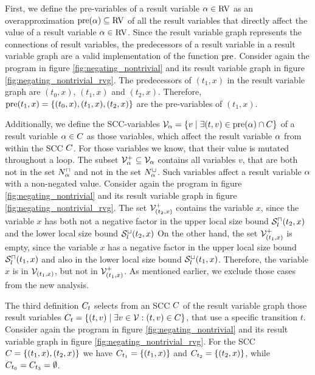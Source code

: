 First, we define the pre-variables of a result variable $\alpha \in \text{RV}$ as an overapproximation $\text{pre}(\alpha) \subseteq \text{RV}$ of all the result variables that directly affect the value of a result variable $\alpha \in \text{RV}$.
Since the result variable graph represents the connections of result variables, the predecessors of a result variable in a result variable graph are a valid implementation of the function $\text{pre}$.
Consider again the program in figure \ref{fig:negating_nontrivial} and its result variable graph in figure \ref{fig:negating_nontrivial_rvg}.
The predecessors of $(t_1,x)$ in the result variable graph are $(t_0,x)$, $(t_1,x)$ and $(t_2,x)$.
Therefore, $\text{pre}(t_1,x) = \lbrace (t_0,x), (t_1,x), (t_2,x) \rbrace$ are the pre-variables of $(t_1,x)$.

Additionally, we define the SCC-variables $\mathcal{V}_\alpha = \lbrace  v \mid \exists (t, v) \in \text{pre}(\alpha) \cap C  \rbrace$ of a result variable $\alpha \in C$ as those variables, which affect the result variable $\alpha$ from within the SCC $C$.
For those variables we know, that their value is mutated throughout a loop.
The subset $\mathcal{V}^+_\alpha \subseteq \mathcal{V}_\alpha$ contains all variables $v$, that are both not in the set $N^\sqcap_\alpha$ and not in the set $N^\sqcup_\alpha$.
Such variables affect a result variable $\alpha$ with a non-negated value.
Consider again the program in figure \ref{fig:negating_nontrivial} and its result variable graph in figure \ref{fig:negating_nontrivial_rvg}.
The set $\mathcal{V}^+_{(t_2,x)}$ contains the variable $x$, since the variable $x$ has both not a negative factor in the upper local size bound ${\mathcal{S}^\sqcap_l}(t_2,x)$ and the lower local size bound ${\mathcal{S}^\sqcup_l}(t_2,x)$
On the other hand, the set $\mathcal{V}^+_{(t_1,x)}$ is empty, since the variable $x$ has a negative factor in the upper local size bound ${\mathcal{S}^\sqcap_l}(t_1,x)$ and also in the lower local size bound ${\mathcal{S}^\sqcup_l}(t_1,x)$.
Therefore, the variable $x$ is in $\mathcal{V}_{(t_1,x)}$, but not in $\mathcal{V}^+_{(t_1,x)}$.
As mentioned earlier, we exclude those cases from the new analysis.

The third definition $C_t$ selects from an SCC $C$ of the result variable graph those result variables $C_t = \lbrace (t,v) \mid \exists v \in \mathcal{V} : (t,v) \in C \rbrace$, that use a specific transition $t$.
Consider again the program in figure \ref{fig:negating_nontrivial} and its result variable graph in figure \ref{fig:negating_nontrivial_rvg}.
For the SCC $C = \lbrace (t_1,x), (t_2,x) \rbrace$ we have $C_{t_1} = \lbrace (t_1,x) \rbrace$ and $C_{t_2} = \lbrace (t_2,x) \rbrace$, while $C_{t_0} = C_{t_3} = \emptyset$.

